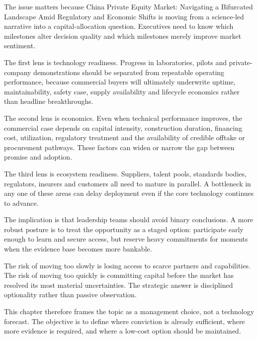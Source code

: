 \documentclass[10pt,a4paper]{article}
\begin{document}
{\small The issue matters because China Private Equity Market: Navigating a Bifurcated Landscape Amid Regulatory and Economic Shifts is moving from a science-led narrative into a capital-allocation question. Executives need to know which milestones alter decision quality and which milestones merely improve market sentiment.}\par
{\small The first lens is technology readiness. Progress in laboratories, pilots and private-company demonstrations should be separated from repeatable operating performance, because commercial buyers will ultimately underwrite uptime, maintainability, safety case, supply availability and lifecycle economics rather than headline breakthroughs.}\par
{\small The second lens is economics. Even when technical performance improves, the commercial case depends on capital intensity, construction duration, financing cost, utilization, regulatory treatment and the availability of credible offtake or procurement pathways. These factors can widen or narrow the gap between promise and adoption.}\par
{\small The third lens is ecosystem readiness. Suppliers, talent pools, standards bodies, regulators, insurers and customers all need to mature in parallel. A bottleneck in any one of these areas can delay deployment even if the core technology continues to advance.}\par
{\small The implication is that leadership teams should avoid binary conclusions. A more robust posture is to treat the opportunity as a staged option: participate early enough to learn and secure access, but reserve heavy commitments for moments when the evidence base becomes more bankable.}\par
{\small The risk of moving too slowly is losing access to scarce partners and capabilities. The risk of moving too quickly is committing capital before the market has resolved its most material uncertainties. The strategic answer is disciplined optionality rather than passive observation.}\par
{\small This chapter therefore frames the topic as a management choice, not a technology forecast. The objective is to define where conviction is already sufficient, where more evidence is required, and where a low-cost option should be maintained.}\par
\label{chap:4:end}
\end{document}
